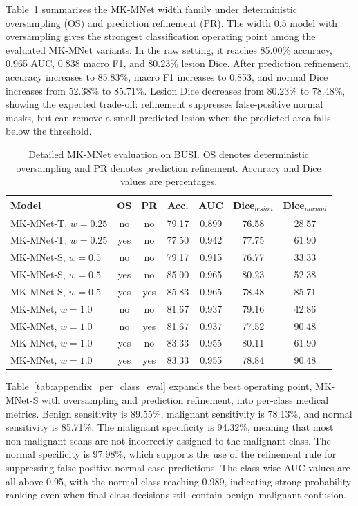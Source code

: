 Table~\ref{tab:appendix_detailed_eval} summarizes the MK-MNet width family under deterministic oversampling (OS) and prediction refinement (PR). The width 0.5 model with oversampling gives the strongest classification operating point among the evaluated MK-MNet variants. In the raw setting, it reaches 85.00\% accuracy, 0.965 AUC, 0.838 macro F1, and 80.23\% lesion Dice. After prediction refinement, accuracy increases to 85.83\%, macro F1 increases to 0.853, and normal Dice increases from 52.38\% to 85.71\%. Lesion Dice decreases from 80.23\% to 78.48\%, showing the expected trade-off: refinement suppresses false-positive normal masks, but can remove a small predicted lesion when the predicted area falls below the threshold.

\begin{table}[h]
\centering
\caption{Detailed MK-MNet evaluation on BUSI. OS denotes deterministic oversampling and PR denotes prediction refinement. Accuracy and Dice values are percentages.}
\begin{tabular}{lcccccc}
\toprule
Model & OS & PR & Acc. & AUC & Dice$_{lesion}$ & Dice$_{normal}$ \\
\midrule
MK-MNet-T, $w=0.25$ & no  & no  & 79.17 & 0.899 & 76.58 & 28.57 \\
MK-MNet-T, $w=0.25$ & yes & no  & 77.50 & 0.942 & 77.75 & 61.90 \\
MK-MNet-S, $w=0.5$  & no  & no  & 79.17 & 0.915 & 76.77 & 33.33 \\
MK-MNet-S, $w=0.5$  & yes & no  & 85.00 & 0.965 & 80.23 & 52.38 \\
MK-MNet-S, $w=0.5$  & yes & yes & 85.83 & 0.965 & 78.48 & 85.71 \\
MK-MNet, $w=1.0$    & no  & no  & 81.67 & 0.937 & 79.16 & 42.86 \\
MK-MNet, $w=1.0$    & no  & yes & 81.67 & 0.937 & 77.52 & 90.48 \\
MK-MNet, $w=1.0$    & yes & no  & 83.33 & 0.955 & 80.11 & 61.90 \\
MK-MNet, $w=1.0$    & yes & yes & 83.33 & 0.955 & 78.84 & 90.48 \\
\bottomrule
\end{tabular}
\label{tab:appendix_detailed_eval}
\end{table}

Table~\ref{tab:appendix_per_class_eval} expands the best operating point, MK-MNet-S with oversampling and prediction refinement, into per-class medical metrics. Benign sensitivity is 89.55\%, malignant sensitivity is 78.13\%, and normal sensitivity is 85.71\%. The malignant specificity is 94.32\%, meaning that most non-malignant scans are not incorrectly assigned to the malignant class. The normal specificity is 97.98\%, which supports the use of the refinement rule for suppressing false-positive normal-case predictions. The class-wise AUC values are all above 0.95, with the normal class reaching 0.989, indicating strong probability ranking even when final class decisions still contain benign--malignant confusion.

